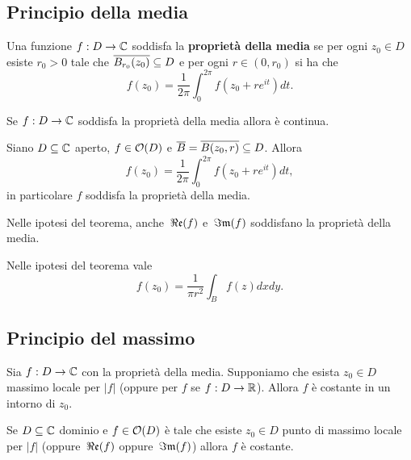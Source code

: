 \begin{multicols*}{2}
\subsection{Principio della media}
\begin{definition}
Una funzione $f:D\to \mathbb{C}$ soddisfa la \textbf{propriet\`a della media} se per ogni $z_0\in D$ esiste $r_0>0$ tale che $\overline{B_{r_0}(z_0)}\subseteq D$ e per ogni $r\in(0,r_0)$ si ha che
\[f(z_0)=\frac1{2\pi}\int_0^{2\pi}f(z_0+re^{it})dt.\]
\end{definition}
\begin{proposition}\label{ProprietaDellaMediaImplicaContinua}
Se $f:D\to \mathbb{C}$ soddisfa la propriet\`a della media allora \`e continua.
\end{proposition}
\begin{theorem}\label{PrincipioDellaMedia}
Siano $D\subseteq\mathbb{C}$ aperto, $f\in\mathcal{O}(D)$ e $\overline{B}=\overline{B(z_0,r)}\subseteq D$. Allora
\[f(z_0)=\frac1{2\pi}\int_0^{2\pi} f(z_0+re^{it})dt,\]
in particolare $f$ soddisfa la propriet\`a della media.
\end{theorem}
\begin{remark}
Nelle ipotesi del teorema, anche $\,\Re\mathfrak{e}(f)$ e $\,\Im\mathfrak{m}(f)$ soddisfano la propriet\`a della media.
\end{remark}
\begin{remark}
Nelle ipotesi del teorema vale
\[f(z_0)=\frac1{\pi r^2}\int_Bf(z)dxdy.\]
\end{remark}



\subsection{Principio del massimo}
\begin{theorem}\label{PrincipioMassimo1}
Sia $f:D\to \mathbb{C}$ con la propriet\`a della media. Supponiamo che esista $z_0\in D$ massimo locale per $|f|$ (oppure per $f$ se $f:D\to \mathbb{R}$). Allora $f$ \`e costante in un intorno di $z_0$.
\end{theorem}

\begin{corollary}\label{OlomorfaConMassimoLocalInModuloOPerComponenteECostante}
Se $D\subseteq \mathbb{C}$ dominio e $f\in\mathcal{O}(D)$ \`e tale che esiste $z_0\in D$ punto di massimo locale per $|f|$ (oppure $\,\Re\mathfrak{e}(f)$ oppure $\,\Im\mathfrak{m}(f)$) allora $f$ \`e costante.
\end{corollary}



\end{multicols*}
